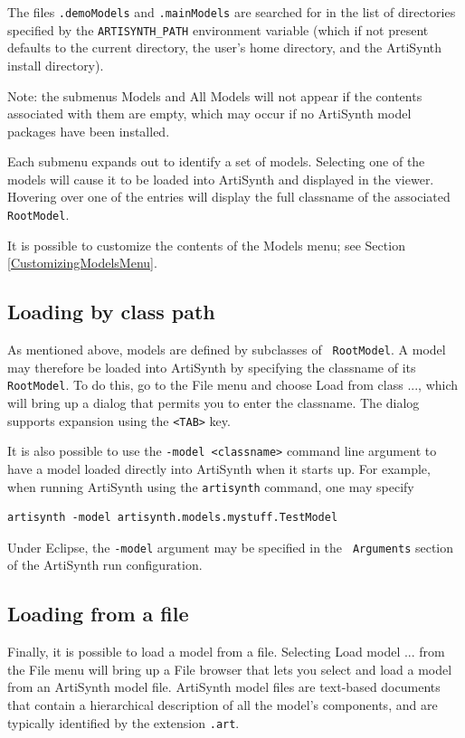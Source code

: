 \documentclass{article}
\begin{document}
The files {\tt .demoModels} and {\tt .mainModels} are searched for in
the list of directories specified by the {\tt ARTISYNTH\_PATH}
environment variable (which if not present defaults to the current
directory, the user's home directory, and the ArtiSynth install
directory).

\begin{sideblock}
Note: the submenus {\sf Models} and {\sf All Models} will not appear
if the contents associated with them are empty, which may occur if no
ArtiSynth model packages have been installed.
\end{sideblock}

Each submenu expands out to identify a set of models. Selecting
one of the models will cause it to be loaded into ArtiSynth and
displayed in the viewer. Hovering over one of the entries will
display the full classname of the associated {\tt RootModel}.

It is possible to customize the contents of the {\sf Models} menu; see
Section \ref{CustomizingModelsMenu}.

\subsection{Loading by class path}

As mentioned above, models are defined by subclasses of {\tt
RootModel}.  A model may therefore be loaded into
ArtiSynth by specifying the classname of its {\tt RootModel}.  To do
this, go to the {\sf File} menu and choose {\sf Load from class ...},
which will bring up a dialog that permits you to enter the
classname. The dialog supports expansion using the {\tt <TAB>} key.

It is also possible to use the {\tt -model <classname>} command line
argument to have a model loaded directly into ArtiSynth when it starts
up. For example, when running ArtiSynth using the {\tt artisynth}
command, one may specify
\begin{lstlisting}[]
  artisynth -model artisynth.models.mystuff.TestModel
\end{lstlisting}
Under Eclipse, the {\tt -model} argument may be specified in the {\tt
Arguments} section of the ArtiSynth run configuration.

\subsection{Loading from a file}

Finally, it is possible to load a model from a file.  Selecting {\sf
Load model ...} from the {\sf File} menu will bring up a File browser
that lets you select and load a model from an ArtiSynth model file.
ArtiSynth model files are text-based documents that contain a
hierarchical description of all the model's components, and are
typically identified by the extension {\tt .art}.
\end{document}
